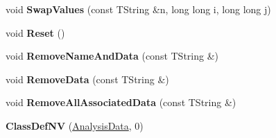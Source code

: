 \begin{DoxyCompactItemize}
\item 
\hypertarget{class_h_a_l_1_1_analysis_data_a44bfe71b3f3c88ce664e6d7b3bd9b111}{void {\bfseries Swap\-Values} (const T\-String \&n, long long i, long long j)}\label{class_h_a_l_1_1_analysis_data_a44bfe71b3f3c88ce664e6d7b3bd9b111}

\item 
\hypertarget{class_h_a_l_1_1_analysis_data_add418841a62be11aad64044e7eda5ffb}{void {\bfseries Reset} ()}\label{class_h_a_l_1_1_analysis_data_add418841a62be11aad64044e7eda5ffb}

\item 
\hypertarget{class_h_a_l_1_1_analysis_data_a39276ed7623a74cf6468fa9a69079e07}{void {\bfseries Remove\-Name\-And\-Data} (const T\-String \&)}\label{class_h_a_l_1_1_analysis_data_a39276ed7623a74cf6468fa9a69079e07}

\item 
\hypertarget{class_h_a_l_1_1_analysis_data_a35cbc682e6090bf2540ac62de07db82f}{void {\bfseries Remove\-Data} (const T\-String \&)}\label{class_h_a_l_1_1_analysis_data_a35cbc682e6090bf2540ac62de07db82f}

\item 
\hypertarget{class_h_a_l_1_1_analysis_data_a9e60f6b78b29280597ac991cf378f4f3}{void {\bfseries Remove\-All\-Associated\-Data} (const T\-String \&)}\label{class_h_a_l_1_1_analysis_data_a9e60f6b78b29280597ac991cf378f4f3}

\item 
\hypertarget{class_h_a_l_1_1_analysis_data_a0d63364d678190ac69e46922ad445b8a}{{\bfseries Class\-Def\-N\-V} (\hyperlink{class_h_a_l_1_1_analysis_data}{Analysis\-Data}, 0)}\label{class_h_a_l_1_1_analysis_data_a0d63364d678190ac69e46922ad445b8a}

\end{DoxyCompactItemize}
